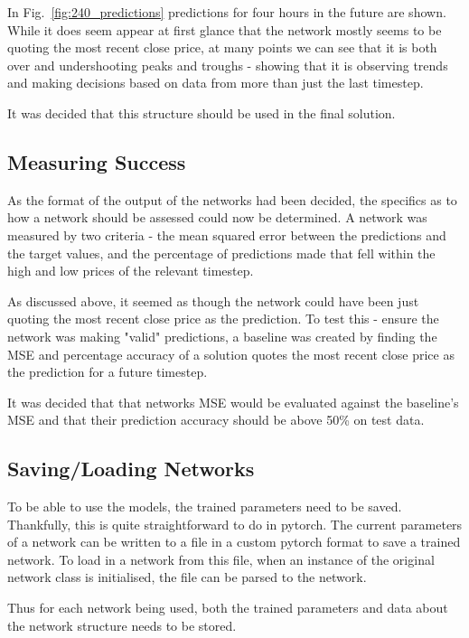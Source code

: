             In Fig.~\ref{fig:240_predictions} predictions for four hours in the future are shown. While it does seem appear at first glance that the network mostly seems to be quoting the most recent close price, at many points we can see that it is both over and undershooting peaks and troughs - showing that it is observing trends and making decisions based on data from more than just the last timestep.

            It was decided that this structure should be used in the final solution.


        \subsection{Measuring Success}
        As the format of the output of the networks had been decided, the specifics as to how a network should be assessed could now be determined. A network was measured by two criteria - the mean squared error between the predictions and the target values, and the percentage of predictions made that fell within the high and low prices of the relevant timestep.

        As discussed above, it seemed as though the network could have been just quoting the most recent close price as the prediction. To test this - ensure the network was making "valid" predictions, a baseline was created by finding the MSE and percentage accuracy of a solution quotes the most recent close price as the prediction for a future timestep. 

        It was decided that that networks MSE would be evaluated against the baseline's MSE and that their prediction accuracy should be above 50\% on test data.
        
        \subsection{Saving/Loading Networks}
        To be able to use the models, the trained parameters need to be saved. Thankfully, this is quite straightforward to do in pytorch. The current parameters of a network can be written to a file in a custom pytorch format to save a trained network. To load in a network from this file, when an instance of the original network class is initialised, the file can be parsed to the network. 
        
        Thus for each network being used, both the trained parameters and data about the network structure needs to be stored.


